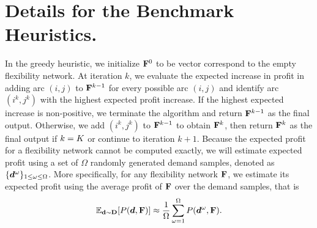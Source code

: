 \documentclass{article} %
\begin{document}

%

\clearpage

\appendix

\section{Details for the Benchmark Heuristics.}\label{sec:heuristicsdetail}
In the greedy heuristic, we initialize $\mathbf{F}^0$ to be vector correspond to the empty flexibility network. At iteration $k$, we evaluate the expected increase in profit in adding arc $(i,j)$ to $\mathbf{F}^{k-1}$ for every possible arc $(i,j)$ and 
identify arc $(i^k, j^k)$ with the highest expected profit increase. If the highest expected increase is non-positive, we terminate the algorithm and return $\mathbf{F}^{k-1}$ as the final output. Otherwise, 
we add $(i^k, j^k)$ to $\mathbf{F}^{k-1}$
to obtain $\mathbf{F}^k$, then return $\mathbf{F}^k$ as the final output if $k = K$ or continue to iteration $k+1$. Because the expected profit for a flexibility network cannot be computed exactly, we will estimate expected profit using a set of $\Omega$ randomly generated demand samples, denoted as $\{\boldsymbol{d}^\omega\}_{1 \leq \omega \leq \Omega}$.
More specifically, for any flexibility network $\mathbf{F}$, we 
estimate its expected profit using the average profit of $\mathbf{F}$ over the demand samples, that is
\begin{equation}\label{eq:sampleestimation}
\mathbb{E}_{\mathbf{d}\sim \mathbf{D}}[P(\boldsymbol{d}, \mathbf{F})] \approx \frac{1}{\Omega}\sum_{\omega=1}^\Omega P(\boldsymbol{d}^\omega, \mathbf{F}).
\end{equation}
\end{document}
